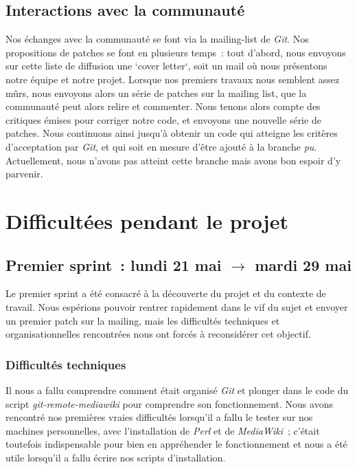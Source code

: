\documentclass[11pt]{article}
\begin{document}
\subsection{Interactions avec la communauté}

Nos échanges avec la communauté se font via la mailing-list de
\textit{Git}. Nos propositions de patches se font en plusieurs temps~:
tout d'abord, nous envoyons sur cette liste de diffusion une `cover
letter`, soit un mail où nous présentons notre équipe et notre
projet. Lorsque nos premiers travaux nous semblent assez mûrs, nous
envoyons alors un série de patches sur la mailing list, que la
communauté peut alors relire et commenter. Nous tenons alors compte
des critiques émises pour corriger notre code, et envoyons une
nouvelle série de patches. Nous continuons ainsi jusqu'à obtenir un
code qui atteigne les critères d'acceptation par \textit{Git}, et qui
soit en mesure d'être ajouté à la branche \textit{pu}.
Actuellement, nous n'avons pas atteint cette branche mais avons bon
espoir d'y parvenir.

\section{Difficultées pendant le projet}

\subsection{Premier sprint~: lundi 21 mai $\rightarrow$ mardi 29 mai}

Le premier sprint a été consacré à la découverte du projet et du
contexte de travail. Nous espérions pouvoir rentrer rapidement dans le
vif du sujet et envoyer un premier patch sur la mailing, mais les
difficultés techniques et organisationnelles rencontrées nous ont
forcés à reconsidérer cet objectif.

\subsubsection{Difficultés techniques}

Il nous a fallu comprendre comment était organisé \textit{Git} et
plonger dans le code du script \textit{git-remote-mediawiki} pour
comprendre son fonctionnement. Nous avons rencontré nos premières
vraies difficultés lorsqu'il a fallu le tester sur nos machines
personnelles, avec l'installation de \textit{Perl} et de
\textit{MediaWiki}~; c'était toutefois indispensable pour bien en
appréhender le fonctionnement et nous a été utile lorsqu'il a fallu
écrire nos scripts d'installation.
\end{document}
